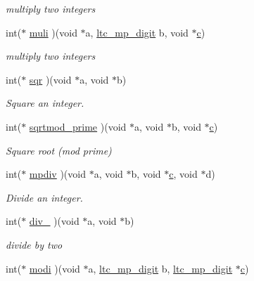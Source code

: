 \begin{DoxyCompactItemize}
\begin{DoxyCompactList}\small\item\em multiply two integers \end{DoxyCompactList}\item 
int($\ast$ \mbox{\hyperlink{structltc__math__descriptor_a3b5e51d99539d173b794c5abeab0390e}{muli}} )(void $\ast$a, \mbox{\hyperlink{tomcrypt__cfg_8h_a4e98fa26a5de0ac87e06af901bad57c4}{ltc\+\_\+mp\+\_\+digit}} b, void $\ast$\mbox{\hyperlink{khazad_8c_a86ea50de5a3e0ae87762f4298d35284c}{c}})
\begin{DoxyCompactList}\small\item\em multiply two integers \end{DoxyCompactList}\item 
int($\ast$ \mbox{\hyperlink{structltc__math__descriptor_add76f47ec6a9e3b331750e6d37c1841b}{sqr}} )(void $\ast$a, void $\ast$b)
\begin{DoxyCompactList}\small\item\em Square an integer. \end{DoxyCompactList}\item 
int($\ast$ \mbox{\hyperlink{structltc__math__descriptor_ae588937a77f227870ff809f5f8f0deb8}{sqrtmod\+\_\+prime}} )(void $\ast$a, void $\ast$b, void $\ast$\mbox{\hyperlink{khazad_8c_a86ea50de5a3e0ae87762f4298d35284c}{c}})
\begin{DoxyCompactList}\small\item\em Square root (mod prime) \end{DoxyCompactList}\item 
int($\ast$ \mbox{\hyperlink{structltc__math__descriptor_a8d4d13c1f48643b29bbb27c17a1fa8bd}{mpdiv}} )(void $\ast$a, void $\ast$b, void $\ast$\mbox{\hyperlink{khazad_8c_a86ea50de5a3e0ae87762f4298d35284c}{c}}, void $\ast$d)
\begin{DoxyCompactList}\small\item\em Divide an integer. \end{DoxyCompactList}\item 
int($\ast$ \mbox{\hyperlink{structltc__math__descriptor_a2ea0c675165d9e8aaa99b65b82b97fbb}{div\+\_}} )(void $\ast$a, void $\ast$b)
\begin{DoxyCompactList}\small\item\em divide by two \end{DoxyCompactList}\item 
int($\ast$ \mbox{\hyperlink{structltc__math__descriptor_a85075e806eb136a3bfb1f23274909406}{modi}} )(void $\ast$a, \mbox{\hyperlink{tomcrypt__cfg_8h_a4e98fa26a5de0ac87e06af901bad57c4}{ltc\+\_\+mp\+\_\+digit}} b, \mbox{\hyperlink{tomcrypt__cfg_8h_a4e98fa26a5de0ac87e06af901bad57c4}{ltc\+\_\+mp\+\_\+digit}} $\ast$\mbox{\hyperlink{khazad_8c_a86ea50de5a3e0ae87762f4298d35284c}{c}})

\end{DoxyCompactItemize}
